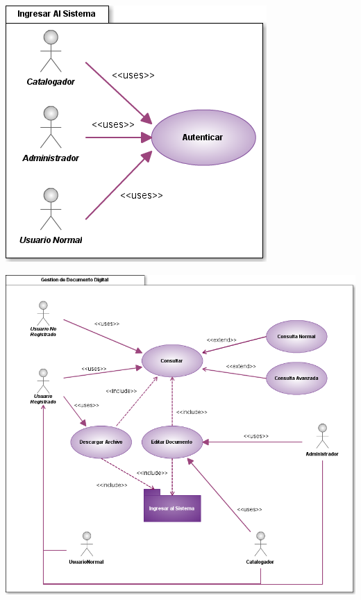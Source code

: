 \documentclass[]{article}
\begin{document}
	\begin{minipage}[c]{1\linewidth}
		\begin{center}
		\includegraphics[scale=.7]{casosUso/CUAutenticar}		
		\end{center}
	\end{minipage}
	
	\begin{minipage}[c]{1\linewidth}
		\begin{center}
		\includegraphics[scale=.5]{casosUso/CUGestionDocumento}
		\end{center}
	\end{minipage}
	
\end{document}
